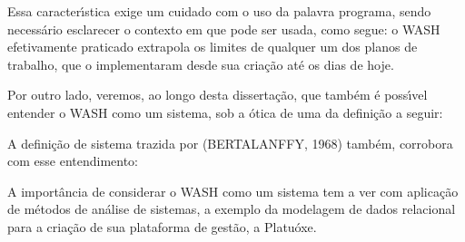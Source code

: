 \documentclass[
12pt,		%
openright,	%
twoside,  %
a4paper,			%
chapter=TITLE,		%
english,			%
french,				%
spanish,			%
brazil				%
]{USPSC-classe/USPSC}
\begin{document}
Essa caracter\'{\i}stica exige um cuidado com o uso da palavra \textquotedbl programa\textquotedbl , sendo necess\'ario esclarecer o contexto em que pode ser usada, como segue: o WASH efetivamente praticado extrapola os limites de qualquer um dos planos de trabalho, que o implementaram desde sua cria\c{c}\~ao at\'e os dias de hoje.









Por outro lado, veremos, ao longo desta disserta\c{c}\~ao, que tamb\'em \'e poss\'{\i}vel entender o WASH como um sistema, sob a \'otica de uma da defini\c{c}\~ao a seguir:










\noindent\begin{center}\mbox{\centering{}}\end{center}


A defini\c{c}\~ao de sistema trazida por (BERTALANFFY, 1968) tamb\'em, corrobora com esse entendimento:










\noindent\begin{center}\mbox{\centering{}}\end{center}


A import\^ancia de considerar o WASH como um sistema tem a ver com aplica\c{c}\~ao de m\'etodos de an\'alise de sistemas, a exemplo da modelagem de dados relacional para a cria\c{c}\~ao de sua plataforma de gest\~ao, a \textquotedbl Platu\'oxe\textquotedbl .
\end{document}
